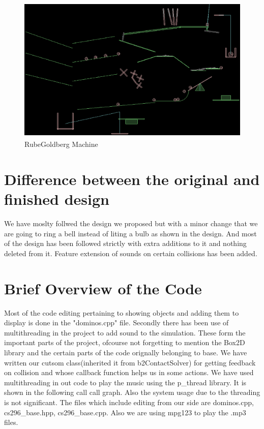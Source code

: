 \documentclass[a4paper,11pt]{article}
\begin{document}
	\begin{figure}[ht]
			\begin{center}
			\includegraphics[height=70mm]{machine.eps}
	\caption{RubeGoldberg Machine}	
	\label{fig:machine}
	\end{center}
	\end{figure}

\pagebreak

\section{Difference between the original and finished design}
We have moslty follwed the design we proposed but with a minor change that we are going to ring a bell instead of liting a bulb as shown in the design. And most of the design has been followed strictly with extra additions to it and nothing deleted from it. Feature extension of sounds on certain collisions has been added.



\section{Brief Overview of the Code}
	Most of the code editing pertaining to showing objects and adding them to display is done in the "dominos.cpp" file. Secondly there has been use of multithreading in the project to add sound to the simulation. These form the important parts of the project, ofcourse not forgetting to mention the Box2D library and the certain parts of the code orignally belonging to base.
	We have written our cutsom class(inherited it from b2ContactSolver) for getting feedback on collision and whose callback function helps us in some actions. 
	We have used multithreading in out code to play the music using the p\_thread library. It is shown in the following call call graph. Also the system usage due to the threading is not significant.
	The files which include editing from our side are dominos.cpp, cs296\_base.hpp, cs296\_base.cpp. Also we are using mpg123 to play the .mp3 files.
\end{document}
